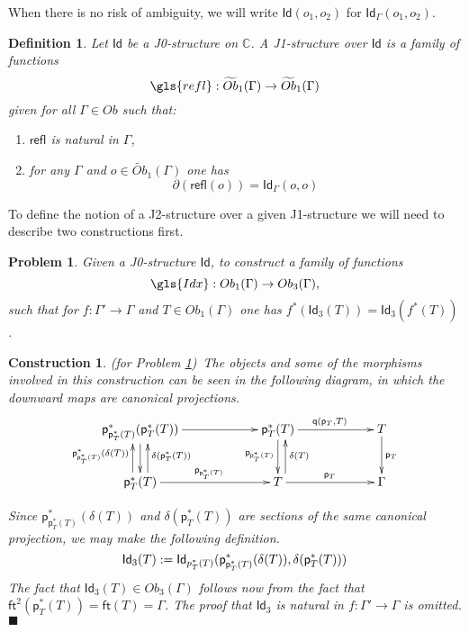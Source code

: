 \documentclass[12pt]{article}
\numberwithin{equation}{section}
\newenvironment{eq}{\begin{equation}}{\end{equation}}
\newtheorem{definition}[proposition]{Definition}
\newtheorem{problem}[proposition]{Problem}
\newtheorem{construction0}[proposition]{Construction}
\newenvironment{construction}[1]{\begin{construction0}(for Problem \ref{#1})\ }{$\blacksquare$ \end{construction0}}
\newcommand{\sr}{\rightarrow}
\newcommand{\wt}{\widetilde}
\newcommand{\CC}{{\mathbb C}}  %
\newcommand{\ft}{\mathsf{ft}}
\newcommand{\p}{\mathsf{p}}
\newcommand{\q}{\mathsf{q}}
\newcommand{\Id}{\mathsf{Id}} %
\newcommand{\Idx}{\mathsf{Id}_3} %
\newcommand{\refl}{\mathsf{refl}}
\newcommand{\Obwt}{\wt{Ob}}
\begin{document}
When there is no risk of ambiguity, we will write $\Id(o_1,o_2)$ for $\Id_{\Gamma}(o_1,o_2)$.

\begin{definition}
\label{2015.03.27.def2}
Let $\Id$ be a J0-structure on $\CC$. A {\em J1-structure} over $\Id$ is a family of
functions
%
$$\gls{refl}:\Obwt_1(\Gamma)\sr \Obwt_1(\Gamma)$$
%
given for all $\Gamma\in Ob$ such that:
%
\begin{enumerate}
\item $\refl$ is natural in $\Gamma$,
\item for any $\Gamma$ and $o\in \Obwt_1(\Gamma)$ one has 
%
\begin{eq}
\label{2015.03.27.eq8}
\partial(\refl(o))=\Id_\Gamma(o,o)
\end{eq}%
\end{enumerate}
\end{definition}
%
To define the notion of a J2-structure over a given J1-structure we will need
to describe two constructions first.

%
\begin{problem}
\label{2015.03.27.prob1} Given a J0-structure $\Id$, to construct a family of
functions
%
$$\gls{Idx}:Ob_1(\Gamma)\sr Ob_3(\Gamma),$$
%
such that for $f:\Gamma'\sr \Gamma$ and $T\in Ob_1(\Gamma)$ one has
$f^*(\Idx(T))=\Idx(f^*(T))$.
\end{problem}
%
\begin{construction}{2015.03.27.prob1}\label{2015.03.27.constr1}\rm
The objects and some of the morphisms involved
in this construction can be seen in the following diagram, in which the
downward maps are canonical projections.
%
\begin{eq}
  \begin{xy}
    \xymatrix@C=5pc{
      \p_{\p_T^*(T)}^*(\p_T^*(T)) \ar[r] \ar[d]                             &
      \p_T^*(T) \ar[r]^{\q(\p_T,T)} \ar[d]_{\p_{\p_T^*(T)}}                     &
      T \ar[d]^{\p_T}                                                      \\
      \p_T^*(T) \ar[r]^{\p_{\p_T^*(T)}}
                \ar@<-6pt>[u]_{\delta(\p_T^*(T))} 
                \ar@<6pt> [u]^{\p_{\p_T^*(T)}^*(\delta(T))}
                                                                         &
      T \ar[r]^{\p_T} \ar@<-6pt>[u]_{\delta(T)}                             &
      \Gamma
    }
  \end{xy}
\end{eq}%

Since $\p_{\p_T^*(T)}^*(\delta(T))$ and $\delta(\p_T^*(T))$ are sections of the
same canonical projection, we may make the following definition.
\begin{eq}
\label{2015.04.06.eq1}
\Idx(T):=\Id_{\\p_T^*(T)}(\p_{\p_T^*(T)}^*(\delta(T)), \delta(\p_T^*(T)))
\end{eq}%
The fact that $\Idx(T)\in Ob_3(\Gamma)$ follows now from the fact that
$\ft^2(\p_T^*(T))=\ft(T)=\Gamma$.
The proof that $\Idx$ is natural in $f:\Gamma'\sr \Gamma$ is omitted.
\end{construction}
\end{document}

